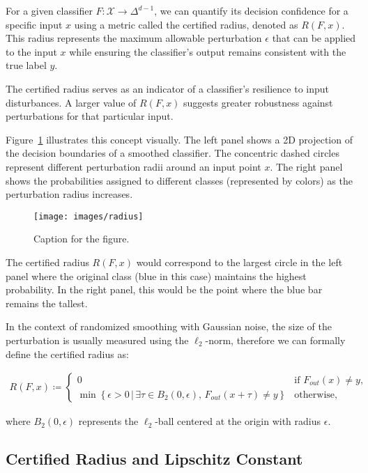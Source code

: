 For a given classifier $F: \mathcal{X} \rightarrow \Delta^{d-1}$, we can quantify its decision confidence for a specific input $x$ using a metric called the certified radius, denoted as $R(F,x)$.
This radius represents the maximum allowable perturbation $\epsilon$ that can be applied to the input $x$ while ensuring the classifier's output remains consistent with the true label $y$.

The certified radius serves as an indicator of a classifier's resilience to input disturbances.
A larger value of $R(F,x)$ suggests greater robustness against perturbations for that particular input.

Figure~\ref{fig:radius} illustrates this concept visually.
The left panel shows a 2D projection of the decision boundaries of a smoothed classifier.
The concentric dashed circles represent different perturbation radii around an input point $x$.
The right panel shows the probabilities assigned to different classes (represented by colors) as the perturbation radius increases.
\begin{figure}[htbp]
    \centering
    \texttt{[image: images/radius]}
    \caption{Caption for the figure.}
    \label{fig:radius}
\end{figure}

The certified radius $R(F,x)$ would correspond to the largest circle in the left panel where the original class (blue in this case) maintains the highest probability. In the right panel, this would be the point where the blue bar remains the tallest.

In the context of randomized smoothing with Gaussian noise, the size of the perturbation is usually measured using the $\ell_2$-norm, therefore we can formally define the certified radius as:

\begin{align*}
    R(F,x) \coloneqq
    \begin{cases}
        0 & \text{if } F_{out}(x) \neq y, \\[2ex]
        \min \left\{ \epsilon > 0 \,|\, \exists \tau \in B_2(0,\epsilon),\, F_{out}(x + \tau) \neq y \right\} & \text{otherwise,}
    \end{cases}
\end{align*}

where $B_2(0,\epsilon)$ represents the $\ell_2$-ball centered at the origin with radius $\epsilon$.

\subsection{Certified Radius and Lipschitz Constant}\label{subsec:certified-radius-and-lipschitz-constant}

